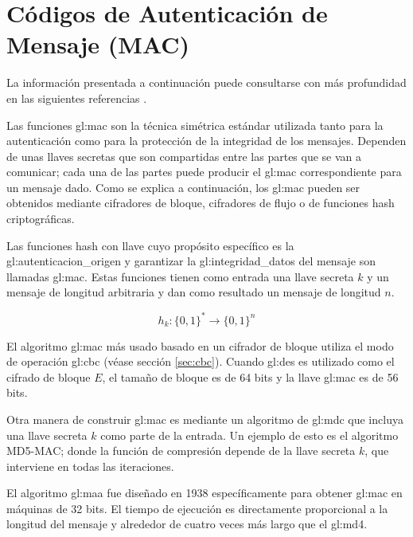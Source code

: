 %
%

\section{Códigos de Autenticación de Mensaje (MAC)}

La información presentada a continuación puede consultarse con más profundidad
en las siguientes referencias
\cite{DBLP:series/isc/DelfsK07, menezes, mac_patel}.

Las funciones \gls{gl:mac} son la técnica simétrica
estándar utilizada tanto para la autenticación como para la protección de la
integridad de los mensajes. Dependen de unas llaves secretas que son
compartidas entre las partes que se van a comunicar; cada una de las
partes puede producir el \gls{gl:mac} correspondiente para un mensaje
dado. Como se explica a continuación, los \gls{gl:mac} pueden ser
obtenidos mediante cifradores de bloque, cifradores de flujo o de funciones
hash criptográficas.

Las funciones hash con llave cuyo propósito específico es la
\gls{gl:autenticacion_origen} y garantizar la \gls{gl:integridad_datos} del
mensaje son llamadas \gls{gl:mac}. Estas funciones tienen como entrada
una llave secreta $k$ y un mensaje de longitud arbitraria y dan como resultado
un mensaje de longitud $n$.

\begin{equation}
  \label{funcion_hash_mac}
  h_k: \{0, 1\}^* \longrightarrow \{0,1\}^n
\end{equation}

El algoritmo \gls{gl:mac} más usado basado en un cifrador de bloque
utiliza el modo de operación \gls{gl:cbc} (véase sección \ref{sec:cbc}).
Cuando \gls{gl:des} es utilizado como el cifrado de bloque $E$, el tamaño
de bloque es de 64 bits y la llave \gls{gl:mac} es de 56 bits.

Otra manera de construir \gls{gl:mac} es mediante un algoritmo
de \gls{gl:mdc} que incluya una llave secreta $k$ como parte de la
entrada. Un ejemplo de esto es el algoritmo MD5-MAC; donde la función de
compresión depende de la llave secreta $k$, que interviene en todas las
iteraciones.

El algoritmo \gls{gl:maa} fue diseñado en 1938 específicamente para
obtener \gls{gl:mac} en máquinas de 32 bits. El tiempo de ejecución
es directamente proporcional a la longitud del mensaje y alrededor de cuatro
veces más largo que el \gls{gl:md4}.

